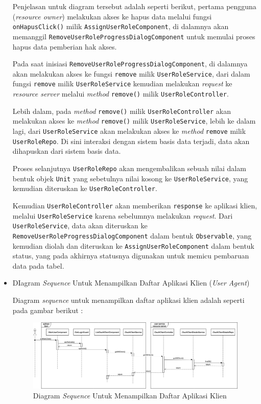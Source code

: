 \documentclass[pdftex,12pt, oneside]{article}
\begin{document}
\begin{itemize}
	Penjelasan untuk diagram tersebut adalah seperti berikut, pertama pengguna (\textit{resource owner}) melakukan akses ke hapus data melalui fungsi \texttt{onHapusClick()} milik \texttt{AssignUserRoleComponent}, di dalamnya akan memanggil \texttt{RemoveUserRoleProgressDialogComponent} untuk memulai proses hapus data pemberian hak akses.
	
	Pada saat inisiasi \texttt{RemoveUserRoleProgressDialogComponent}, di dalamnya akan melakukan akses ke fungsi \texttt{remove} milik \texttt{UserRoleService}, dari dalam fungsi \texttt{remove} milik \texttt{UserRoleService} kemudian melakukan \textit{request} ke \textit{resource server} melalui \textit{method} \texttt{remove()} milik \texttt{UserRoleController}. 
	
	Lebih dalam, pada \textit{method} \texttt{remove()} milik \texttt{UserRoleController} akan melakukan akses ke \textit{method} \texttt{remove()} milik \texttt{UserRoleService}, lebih ke dalam lagi, dari \texttt{UserRoleService} akan melakukan akses ke \textit{method} \texttt{remove} milik \texttt{UserRoleRepo}. Di sini interaksi dengan sistem basis data terjadi, data akan dihapuskan dari sistem basis data.
	
	Proses selanjutnya \texttt{UserRoleRepo} akan mengembalikan sebuah nilai dalam bentuk objek \texttt{Unit} yang sebetulnya nilai kosong ke \texttt{UserRoleService}, yang kemudian diteruskan ke \texttt{UserRoleController}.
	
	Kemudian \texttt{UserRoleController} akan memberikan \texttt{response} ke aplikasi klien, melalui \texttt{UserRoleService} karena sebelumnya melakukan \textit{request}. Dari \texttt{UserRoleService}, data akan diteruskan ke \texttt{RemoveUserRoleProgressDialogComponent} dalam bentuk \texttt{Observable}, yang kemudian diolah dan diteruskan ke \texttt{AssignUserRoleComponent} dalam bentuk status, yang pada akhirnya statusnya digunakan untuk memicu pembaruan data pada tabel.
	
	\item DIagram \textit{Sequence} Untuk Menampilkan Daftar Aplikasi Klien (\textit{User Agent})
	
	Diagram \textit{sequence} untuk menampilkan daftar aplikasi klien adalah seperti pada gambar berikut :
	
	\begin{figure}[H]
		\centering
		\includegraphics[width=1\textwidth]{./resources/seq-list-client}
		\caption{Diagram \textit{Sequence} Untuk Menampilkan Daftar Aplikasi Klien}
		\label{fig:seq-list-client}
	\end{figure}
	

\end{itemize}
\end{document}
